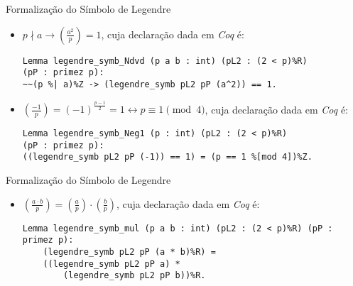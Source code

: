 \begin{frame}[fragile]{Formalização do Símbolo de Legendre}

    \begin{itemize}
        \item $p \nmid a \rightarrow \left(\frac{a^2}{p}\right) = 1$, cuja declaração dada em \textit{Coq} é:
        \newline
            \begin{lstlisting}[language=coq,frame=single,tabsize=1]
Lemma legendre_symb_Ndvd (p a b : int) (pL2 : (2 < p)%R) 
(pP : primez p):
~~(p %| a)%Z -> (legendre_symb pL2 pP (a^2)) == 1.
            \end{lstlisting}

        \item $\left(\frac{-1}{p}\right) = (-1)^{\frac{p - 1}{2}} = 1 \leftrightarrow p \equiv 1 \pmod{4}$, cuja declaração dada em \textit{Coq} é:
        \newline
            \begin{lstlisting}[language=coq,frame=single,tabsize=1]
Lemma legendre_symb_Neg1 (p : int) (pL2 : (2 < p)%R) 
(pP : primez p):
((legendre_symb pL2 pP (-1)) == 1) = (p == 1 %[mod 4])%Z.
            \end{lstlisting}

    \end{itemize}

\end{frame}

\begin{frame}[fragile]{Formalização do Símbolo de Legendre}

    \begin{itemize}
        \item $\left(\frac{a \cdot b}{p}\right) = \left(\frac{a}{p}\right) \cdot \left(\frac{b}{p}\right)$, cuja declaração dada em \textit{Coq} é:
        \newline
            \begin{lstlisting}[language=coq,frame=single,tabsize=1]
Lemma legendre_symb_mul (p a b : int) (pL2 : (2 < p)%R) (pP : primez p):
    (legendre_symb pL2 pP (a * b)%R) = 
    ((legendre_symb pL2 pP a) * 
        (legendre_symb pL2 pP b))%R.
            \end{lstlisting}
    \end{itemize}

\end{frame}

